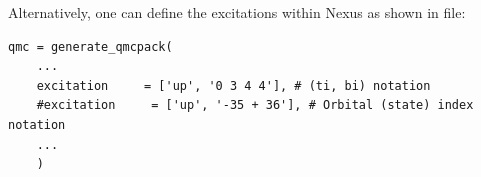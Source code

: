 Alternatively, one can define the excitations within Nexus as shown in  file:
\begin{lstlisting}[style=Python]
qmc = generate_qmcpack(
    ...
    excitation     = ['up', '0 3 4 4'], # (ti, bi) notation
    #excitation     = ['up', '-35 + 36'], # Orbital (state) index notation
    ...
    )
\end{lstlisting}

